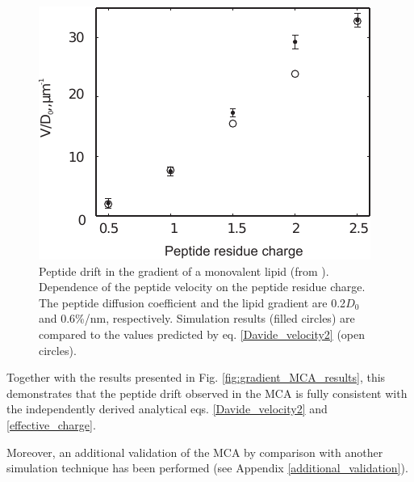 \begin{figure}[!ht]
\begin{center}
  \includegraphics[scale=1.12]{../figures/peptide_residue_charge_varying.pdf}
\end{center}
 \caption[Peptide drift in the gradient of a monovalent lipid (2)]{Peptide drift in the gradient of a monovalent lipid (from \cite{Kiselev2011}). Dependence of the peptide velocity on the peptide residue charge. The peptide diffusion coefficient and the lipid gradient are 0.2$D_0$ and 0.6\%/nm, respectively. Simulation results (filled circles) are compared to the values predicted by eq. \eqref{Davide_velocity2} (open circles).}
\label{fig:peptide_residue_charge_varying}
\end{figure}

Together with the results presented in Fig. \ref{fig:gradient_MCA_results}, this demonstrates that the peptide drift observed in the MCA is fully consistent with the independently derived analytical eqs. \eqref{Davide_velocity2} and \eqref{effective_charge}. 

Moreover, an additional validation of the MCA by comparison with another simulation technique has been performed (see Appendix \ref{additional_validation}).


